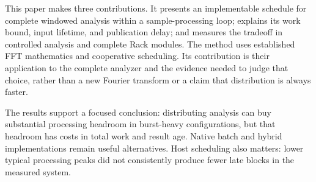 This paper makes three contributions. It presents an implementable schedule
for complete windowed analysis within a sample-processing loop; explains its
work bound, input lifetime, and publication delay; and measures the tradeoff
in controlled analysis and complete Rack modules. The method uses established
FFT mathematics and cooperative scheduling. Its contribution is their
application to the complete analyzer and the evidence needed to judge that
choice, rather than a new Fourier transform or a claim that distribution is
always faster.

The results support a focused conclusion: distributing analysis can buy
substantial processing headroom in burst-heavy configurations, but that
headroom has costs in total work and result age. Native batch and hybrid
implementations remain useful alternatives. Host scheduling also matters:
lower typical processing peaks did not consistently produce fewer late blocks
in the measured system.
